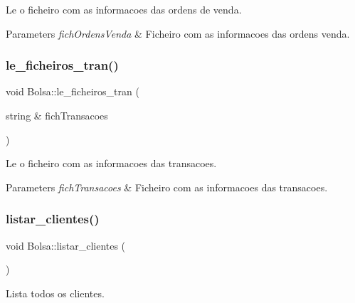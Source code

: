 Le o ficheiro com as informacoes das ordens de venda. 


\begin{DoxyParams}{Parameters}
{\em fich\+Ordens\+Venda} & Ficheiro com as informacoes das ordens venda. \\
\hline
\end{DoxyParams}
\hypertarget{class_bolsa_ab099261f63bff9e274b94bca96cbd2f4}{}\label{class_bolsa_ab099261f63bff9e274b94bca96cbd2f4} 
\subsubsection{\texorpdfstring{le\+\_\+ficheiros\+\_\+tran()}{le\_ficheiros\_tran()}}
{\footnotesize\ttfamily void Bolsa\+::le\+\_\+ficheiros\+\_\+tran (\begin{DoxyParamCaption}\item[{string \&}]{fich\+Transacoes }\end{DoxyParamCaption})}



Le o ficheiro com as informacoes das transacoes. 


\begin{DoxyParams}{Parameters}
{\em fich\+Transacoes} & Ficheiro com as informacoes das transacoes. \\
\hline
\end{DoxyParams}
\hypertarget{class_bolsa_aba662f57e78213bee6de3db7c06c7293}{}\label{class_bolsa_aba662f57e78213bee6de3db7c06c7293} 
\subsubsection{\texorpdfstring{listar\+\_\+clientes()}{listar\_clientes()}}
{\footnotesize\ttfamily void Bolsa\+::listar\+\_\+clientes (\begin{DoxyParamCaption}{ }\end{DoxyParamCaption})}



Lista todos os clientes. 

\hypertarget{class_bolsa_a419cf3df5db87b4925eb616af1180f88}{}\label{class_bolsa_a419cf3df5db87b4925eb616af1180f88} 
